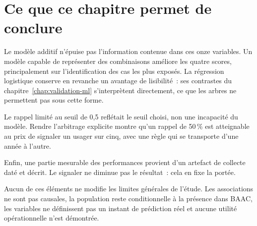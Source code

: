 \section{Ce que ce chapitre permet de conclure}
Le modèle additif n'épuise pas l'information contenue dans ces onze variables. Un modèle
capable de représenter des combinaisons améliore les quatre scores, principalement sur
l'identification des cas les plus exposés. La régression logistique conserve en revanche
un avantage de lisibilité~: ses contrastes du chapitre~\ref{chap:validation-ml}
s'interprètent directement, ce que les arbres ne permettent pas sous cette forme.

Le rappel limité au seuil de 0,5 reflétait le seuil choisi, non une incapacité du modèle.
Rendre l'arbitrage explicite montre qu'un rappel de 50\,\% est atteignable au prix de
signaler un usager sur cinq, avec une règle qui se transporte d'une année à l'autre.

Enfin, une partie mesurable des performances provient d'un artefact de collecte daté et
décrit. Le signaler ne diminue pas le résultat~: cela en fixe la portée.

Aucun de ces éléments ne modifie les limites générales de l'étude. Les associations ne
sont pas causales, la population reste conditionnelle à la présence dans BAAC, les
variables ne définissent pas un instant de prédiction réel et aucune utilité
opérationnelle n'est démontrée.

\FloatBarrier
{}
